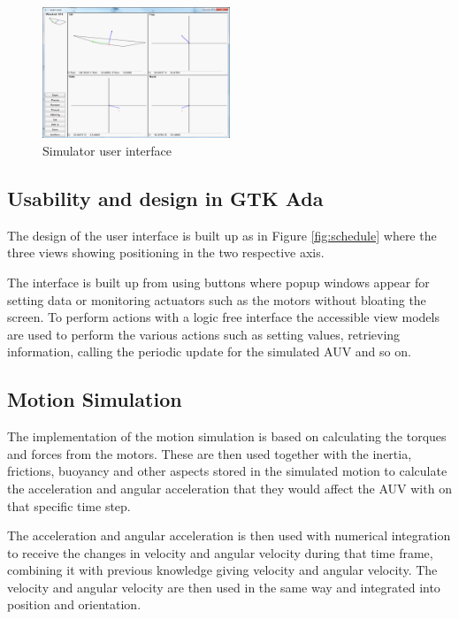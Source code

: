 \begin{figure}[h]
    \includegraphics[width=0.5\textwidth]{./figure/Simulator-mod-500x350.png}
    \caption{Simulator user interface}
    \label{fig:one_column_figure}
\end{figure}
\pagebreak

\subsection{Usability and design in GTK Ada}


The design of the user interface is built up as in Figure \ref{fig:schedule} where the three views showing positioning in the two respective axis.

The interface is built up from using buttons where popup windows appear for setting data or monitoring actuators such as the motors without bloating the screen. To perform actions with a logic free interface the accessible view models are used to perform the various actions such as setting values, retrieving information, calling the periodic update for the simulated AUV and so on.

\subsection{Motion Simulation}
The implementation of the motion simulation is based on calculating the torques and forces from the motors. These are then used together with the inertia, frictions, buoyancy and other aspects stored in the simulated motion to calculate the acceleration and angular acceleration that they would affect the AUV with on that specific time step.
 
The acceleration and angular acceleration is then used with numerical integration to receive the changes in velocity and angular velocity during that time frame, combining it with previous knowledge giving velocity and angular velocity. The velocity and angular velocity are then used in the same way and integrated into position and orientation. 

